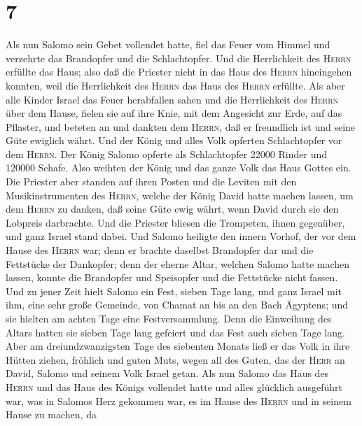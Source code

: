 \hypertarget{section-6}{%
\section{7}\label{section-6}}

 Als nun Salomo sein Gebet vollendet hatte, fiel das Feuer
vom Himmel und verzehrte das Brandopfer und die Schlachtopfer. Und die
Herrlichkeit des \textsc{Herrn} erfüllte das Haus;  also
daß die Priester nicht in das Haus des \textsc{Herrn} hineingehen
konnten, weil die Herrlichkeit des \textsc{Herrn} das Haus des
\textsc{Herrn} erfüllte.  Als aber alle Kinder Israel das
Feuer herabfallen sahen und die Herrlichkeit des \textsc{Herrn} über dem
Hause, fielen sie auf ihre Knie, mit dem Angesicht zur Erde, auf das
Pflaster, und beteten an und dankten dem \textsc{Herrn}, daß er
freundlich ist und seine Güte ewiglich währt.  Und der
König und alles Volk opferten Schlachtopfer vor dem \textsc{Herrn}.
 Der König Salomo opferte als Schlachtopfer 22000 Rinder
und 120000 Schafe. Also weihten der König und das ganze Volk das Haus
Gottes ein.  Die Priester aber standen auf ihren Posten
und die Leviten mit den Musikinstrumenten des \textsc{Herrn}, welche der
König David hatte machen lassen, um dem \textsc{Herrn} zu danken, daß
seine Güte ewig währt, wenn David durch sie den Lobpreis darbrachte. Und
die Priester bliesen die Trompeten, ihnen gegenüber, und ganz Israel
stand dabei.  Und Salomo heiligte den innern Vorhof, der
vor dem Hause des \textsc{Herrn} war; denn er brachte daselbst
Brandopfer dar und die Fettstücke der Dankopfer; denn der eherne Altar,
welchen Salomo hatte machen lassen, konnte die Brandopfer und Speisopfer
und die Fettstücke nicht fassen.  Und zu jener Zeit hielt
Salomo ein Fest, sieben Tage lang, und ganz Israel mit ihm, eine sehr
große Gemeinde, von Chamat an bis an den Bach Ägyptens; 
und sie hielten am achten Tage eine Festversammlung. Denn die Einweihung
des Altars hatten sie sieben Tage lang gefeiert und das Fest auch sieben
Tage lang.  Aber am dreiundzwanzigsten Tage des siebenten
Monats ließ er das Volk in ihre Hütten ziehen, fröhlich und guten Muts,
wegen all des Guten, das der \textsc{Herr} an David, Salomo und seinem
Volk Israel getan.  Als nun Salomo das Haus des
\textsc{Herrn} und das Haus des Königs vollendet hatte und alles
glücklich ausgeführt war, was in Salomos Herz gekommen war, es im Hause
des \textsc{Herrn} und in seinem Hause zu machen,  da
